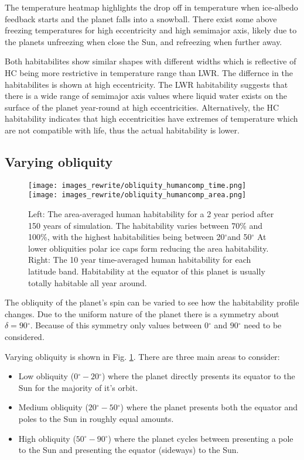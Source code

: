 \documentclass[12pt, onecolumn]{revtex4-2}    %
\newcommand{\degrees}{\ensuremath{^{\circ}}}
\begin{document}
The temperature heatmap highlights the drop off in temperature when ice-albedo feedback starts and the planet falls into a snowball.
There exist some above freezing temperatures for high eccentricity and high semimajor axis, likely due to the planets unfreezing when close the Sun, and refreezing when further away.

Both habitabilites show similar shapes with different widths which is reflective of HC being more restrictive in temperature range than LWR.
The differnce in the habitabilites is shown at high eccentricity.
The LWR habitability suggests that there is a wide range of semimajor axis values where liquid water exists on the surface of the planet year-round at high eccentricities.
Alternatively, the HC habitability indicates that high eccentricities have extremes of temperature which are not compatible with life, thus the actual habitability is lower.



\subsection{Varying obliquity} \label{ssec:qualitative_obliquity}
%
\begin{figure}[t]
  \texttt{[image: images\_rewrite/obliquity\_humancomp\_time.png]}
  \texttt{[image: images\_rewrite/obliquity\_humancomp\_area.png]}
  \caption{
    Left: The area-averaged human habitability for a 2 year period after 150 years of simulation.
    The habitability varies between 70\% and 100\%, with the highest habitabilities being between 20\degrees and 50\degrees
    At lower obliquities polar ice caps form reducing the area habitability.
    Right: The 10 year time-averaged human habitability for each latitude band.
    Habitability at the equator of this planet is usually totally habitable all year around.
  }
  \label{fig:qualitative_obliquity}
\end{figure}

The obliquity of the planet's spin can be varied to see how the habitability profile changes.
Due to the uniform nature of the planet there is a symmetry about $\delta = 90\degrees$.
Because of this symmetry only values between $0\degrees$ and $90\degrees$ need to be considered.

Varying obliquity is shown in Fig. \ref{fig:qualitative_obliquity}.
There are three main areas to consider:
\begin{itemize}
  \item Low obliquity ($0\degrees - 20\degrees$) where the planet directly presents its equator to the Sun for the majority of it's orbit.
  \item Medium obliquity ($20\degrees - 50\degrees$) where the planet presents both the equator and poles to the Sun in roughly equal amounts.
  \item High obliquity ($50\degrees - 90\degrees$) where the planet cycles between presenting a pole to the Sun and presenting the equator (sideways) to the Sun.
\end{itemize}
\end{document}

